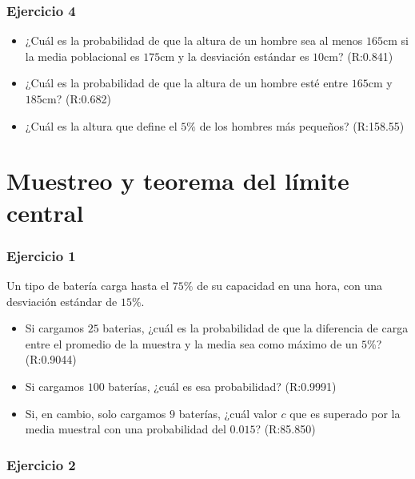 \documentclass[
]{book}
\begin{document}
\hypertarget{ejercicio-4-2}{%
\subsubsection{Ejercicio 4}\label{ejercicio-4-2}}

\begin{itemize}
\item
  ¿Cuál es la probabilidad de que la altura de un hombre sea al menos
  \(165\)cm si la media poblacional es \(175\)cm y la desviación estándar es \(10\)cm? (R:0.841)
\item
  ¿Cuál es la probabilidad de que la altura de un hombre esté entre
  \(165\)cm y \(185\)cm? (R:0.682)
\item
  ¿Cuál es la altura que define el \(5\%\) de los hombres más pequeños? (R:158.55)
\end{itemize}

\hypertarget{muestreo-y-teorema-del-luxedmite-central}{%
\section{Muestreo y teorema del límite central}\label{muestreo-y-teorema-del-luxedmite-central}}

\hypertarget{ejercicio-1-5}{%
\subsubsection{Ejercicio 1}\label{ejercicio-1-5}}

Un tipo de batería carga hasta el \(75\%\) de su capacidad en una hora, con una desviación estándar de \(15\%\).

\begin{itemize}
\item
  Si cargamos \(25\) baterias, ¿cuál es la probabilidad de que la diferencia de carga entre el promedio de la muestra y la media sea como máximo de un \(5\%\)? (R:0.9044)
\item
  Si cargamos \(100\) baterías, ¿cuál es esa probabilidad? (R:0.9991)
\item
  Si, en cambio, solo cargamos \(9\) baterías, ¿cuál valor \(c\) que es superado por la media muestral con una probabilidad del \(0.015\)? (R:85.850)
\end{itemize}

\hypertarget{ejercicio-2-5}{%
\subsubsection{Ejercicio 2}\label{ejercicio-2-5}}
\end{document}

